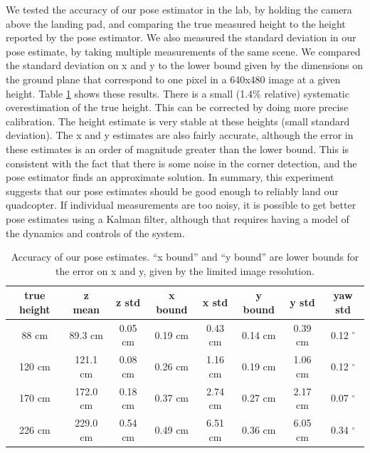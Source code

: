 \documentclass[10pt]{scrartcl} %
\begin{document}
We tested the accuracy of our pose estimator in the lab, by holding the camera
above the landing pad, and comparing the true measured height to the height
reported by the pose estimator. We also measured the standard deviation in our
pose estimate, by taking multiple measurements of the same scene. We compared
the standard deviation on x and y to the lower bound given by the dimensions on
the ground plane that correspond to one pixel in a 640x480 image at a given
height. Table \ref{tab:pose-accu} shows these results. There is a small (1.4\%
relative) systematic overestimation of the true height. This can be corrected
by doing more precise calibration. The height estimate is very stable at these
heights (small standard deviation). The x and y estimates are also fairly
accurate, although the error in these estimates is an order of magnitude
greater than the lower bound. This is consistent with the fact that there is
some noise in the corner detection, and the pose estimator finds an approximate
solution. In summary, this experiment suggests that our pose estimates should
be good enough to reliably land our quadcopter. If individual measurements are
too noisy, it is possible to get better pose estimates using a Kalman filter,
although that requires having a model of the dynamics and controls of the
system.

\begin{table}[h!]
    \centering
    \begin{tabular}{c|cc|cc|cc|c}
        true height & z mean    & z std     & x bound   & x std     & y bound   & y std     & yaw std \\
        \hline
         88 cm      & 89.3 cm   & 0.05 cm   & 0.19 cm   & 0.43 cm   & 0.14 cm   & 0.39 cm   & 0.12 $^{\circ}$ \\
        120 cm      & 121.1 cm  & 0.08 cm   & 0.26 cm   & 1.16 cm   & 0.19 cm   & 1.06 cm   & 0.12 $^{\circ}$ \\
        170 cm      & 172.0 cm  & 0.18 cm   & 0.37 cm   & 2.74 cm   & 0.27 cm   & 2.17 cm   & 0.07 $^{\circ}$ \\
        226 cm      & 229.0 cm  & 0.54 cm   & 0.49 cm   & 6.51 cm   & 0.36 cm   & 6.05 cm   & 0.34 $^{\circ}$ \\
    \end{tabular}
    \caption{
        Accuracy of our pose estimates. ``x bound'' and ``y bound'' are lower
        bounds for the error on x and y, given by the limited image resolution.
    }
    \label{tab:pose-accu}
\end{table}
\end{document}
